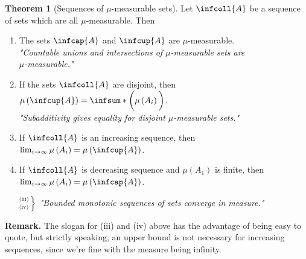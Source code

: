 \documentclass[a5paper]{article}
\theoremstyle{definition}%
\newtheorem*{theorem*}{Theorem} %
\numberwithin{exercise}{section}
\theoremstyle{remark}%
\renewcommand{\measure}[1]{\mu\left(#1\right)}
\newcommand{\mumeasurable}{$\mu$-measurable}
\begin{document}
\begin{highlight}
\begin{theorem*}[Sequences of \mumeasurable{} sets] 
Let $\infcoll{A}$ be a sequence of sets which are all \mumeasurable{}. Then
\begin{enumerate}[label=(\roman*)]

\item The sets $\infcap{A}$ and $\infcup{A}$ are \mumeasurable{}. \\
\textit{"Countable unions and intersections of \mumeasurable{} sets are \\ \mumeasurable{}."}

\item If the sets $\infcoll{A}$ are disjoint, then $\measure{\infcup{A}}=\infsum*{\bigg(\measure{A_i}\bigg)}$. \\
\textit{"Subadditivity gives equality for disjoint \mumeasurable{} sets."}

\item If $\infcoll{A}$ is an increasing sequence, then $
\lim_{i\to\infty}\measure{A_i}=\measure{\infcup{A}}$. %
\bigskip

\item If $\infcoll{A}$ is decreasing sequence and $\measure{A_1}$ is finite, then \\ $
\lim_{i\to\infty}\measure{A_i}=\measure{\infcap{A}}$. 

\item[$\left.{}^{\text{(iii)}}_{\text{(iv)}}\right\rbrace$] \emph{"Bounded monotonic sequences of sets converge in measure."}
\end{enumerate}
\end{theorem*}
\end{highlight}

\noindent \textbf{Remark.} The slogan for (iii) and (iv) above has the advantage of being easy to quote, but strictly speaking, an upper bound is not necessary for increasing sequences, since we're fine with the measure being infinity. 
\end{document}
